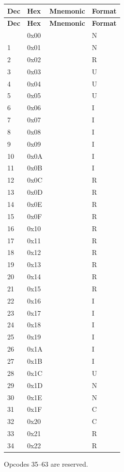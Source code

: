 \documentclass[11pt]{article}
\begin{document}
\begin{center}
\begin{longtable}{@{}C{1.3cm} C{1.3cm} L{3.2cm} C{2.0cm}@{}}
\toprule
\textbf{Dec} & \textbf{Hex} & \textbf{Mnemonic} & \textbf{Format} \\
\midrule
\endfirsthead
\toprule
\textbf{Dec} & \textbf{Hex} & \textbf{Mnemonic} & \textbf{Format} \\
\midrule
\endhead
\bottomrule
{}  & 0x00 &     & N \\
1  & 0x01 &     & N \\
2  & 0x02 &     & R \\
3  & 0x03 &   & U \\
4  & 0x04 &  & U \\
5  & 0x05 &  & U \\
6  & 0x06 &    & I \\
7  & 0x07 &   & I \\
8  & 0x08 &   & I \\
9  & 0x09 &    & I \\
10 & 0x0A &   & I \\
11 & 0x0B &   & I \\
12 & 0x0C &     & R \\
13 & 0x0D &     & R \\
14 & 0x0E &     & R \\
15 & 0x0F &     & R \\
16 & 0x10 &      & R \\
17 & 0x11 &     & R \\
18 & 0x12 &     & R \\
19 & 0x13 &     & R \\
20 & 0x14 &     & R \\
21 & 0x15 &     & R \\
22 & 0x16 &     & I \\
23 & 0x17 &     & I \\
24 & 0x18 &     & I \\
25 & 0x19 &     & I \\
26 & 0x1A &    & I \\
27 & 0x1B &    & I \\
28 & 0x1C &     & U \\
29 & 0x1D &   & N \\
30 & 0x1E &    & N \\
31 & 0x1F &    & C \\
32 & 0x20 &    & C \\
33 & 0x21 &    & R \\
34 & 0x22 &      & R \\
\end{longtable}
\end{center}
\noindent Opcodes 35--63 are reserved.
\end{document}
